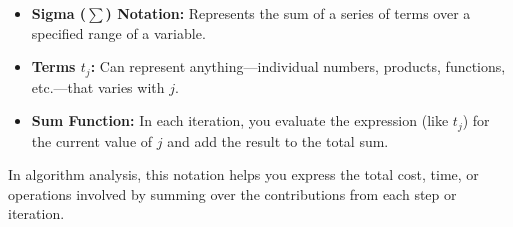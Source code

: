 \documentclass{article}
\begin{document}
\begin{itemize}
    \item \textbf{Sigma (\(\sum\)) Notation:} Represents the sum of a series of terms over a specified range of a variable.
    \item \textbf{Terms \( t_j \):} Can represent anything—individual numbers, products, functions, etc.—that varies with \( j \).
    \item \textbf{Sum Function:} In each iteration, you evaluate the expression (like \( t_j \)) for the current value of \( j \) and add the result to the total sum.
\end{itemize}

In algorithm analysis, this notation helps you express the total cost, time, or operations involved by summing over the contributions from each step or iteration.
\end{document}
